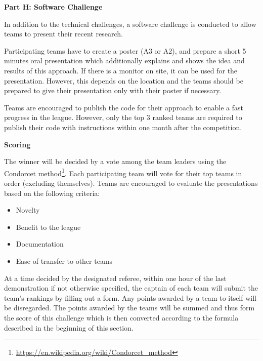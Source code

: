 \clearpage
\sffamily
{\bfseries\color[rgb]{0.4,0.4,0.4} Part H: Software Challenge}
{}

\bigskip
In addition to the technical challenges, a software challenge is conducted to allow teams to present their recent research.

\smallskip

Participating teams have to create a poster (A3 or A2), and prepare a short 5 minutes oral presentation which additionally explains and shows the idea and results of this approach.
If there is a monitor on site, it can be used for the presentation. 
However, this depends on the location and the teams should be prepared to give their presentation only with their poster if necessary.

\smallskip

Teams are encouraged to publish the code for their approach to enable a fast progress in the league. 
However, only the top 3 ranked teams are required to publish their code
with instructions within one month after the competition.
\bigskip

{\bfseries Scoring}
\smallskip

The winner will be decided by a vote among the team leaders using the Condorcet method\footnote{\url{https://en.wikipedia.org/wiki/Condorcet_method}}. 
Each participating team will vote for their top teams in order (excluding themselves). 
Teams are encouraged to evaluate the presentations based on the following criteria:

\begin{itemize}
	\item Novelty
	\item Benefit to the league
	\item Documentation
	\item Ease of transfer to other teams
\end{itemize}

At a time decided by the designated referee, within one hour of the last demonstration if not otherwise specified, the captain of each team will submit the team's rankings by filling out a form. 
Any points awarded by a team to itself will be disregarded.
The points awarded by the teams will be summed and thus form the score of this challenge which is then converted according to the formula described in the beginning of this section.

\smallskip
